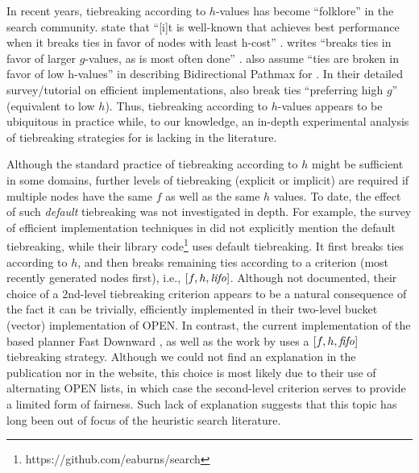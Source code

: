 In recent years, tiebreaking according to $h$-values has become ``folklore'' in the search community.
\citeauthor{hansen2007anytime} state that ``[i]t is well-known 
that \astar achieves best performance when it breaks ties
in favor of nodes with least h-cost'' \cite{hansen2007anytime}.
\citeauthor{holte2010common} writes ``\astar breaks ties in favor
of larger $g$-values, as is most often done'' \cite[note that since $f=g+h$,
preferring large $g$ is equivalent to preferring smaller $h$]{holte2010common}.
 also assume ``ties are broken in
favor of low h-values'' in describing Bidirectional Pathmax for \astar \citeyear{felner2011inconsistent}.
In their detailed survey/tutorial on efficient \astar implementations,
 \citeyear{burns2012implementing}
also break ties ``preferring high $g$'' (equivalent to low $h$).
Thus, tiebreaking according to $h$-values appears
to be ubiquitous in practice while,
to our knowledge, an in-depth experimental analysis of tiebreaking strategies for \astar is lacking in the literature.

Although the standard practice of tiebreaking according to $h$ might be
sufficient in some domains, further levels of tiebreaking (explicit or
implicit) are required if multiple nodes have the same $f$ as well as
the same $h$ values. To date, the effect of such \emph{default}
tiebreaking was not investigated in depth.
% 
For example, the survey of efficient \astar implementation techniques in
\cite{burns2012implementing} did not explicitly mention the default
tiebreaking, while their library
code\footnote{https://github.com/eaburns/search} uses \lifo
default tiebreaking.
% 
It first breaks ties according to $h$, and then
breaks remaining ties according to a \lifo criterion (most recently
generated nodes first), i.e., $[f,h,{\text{\textit{lifo}}}]$.
% 
Although not documented, their choice of a \lifo 2nd-level tiebreaking
criterion appears to be a natural consequence of the fact it can be
trivially, efficiently implemented in their two-level bucket (vector)
implementation of OPEN.
% 
In contrast, the current implementation of the \sota \astar based planner Fast
Downward \cite{Helmert2006}, as well as the work by \cite{RogerH10} uses
a $[f,h,{\text{\textit{fifo}}}]$ tiebreaking strategy.
% 
Although we could not find an explanation in the publication nor in the
website, this choice is most likely due to their use of alternating OPEN
lists, in which case the \fifo second-level criterion serves to provide a
limited form of fairness.
% 
Such lack of explanation suggests that this topic has long been out
of focus of the heuristic search literature.
